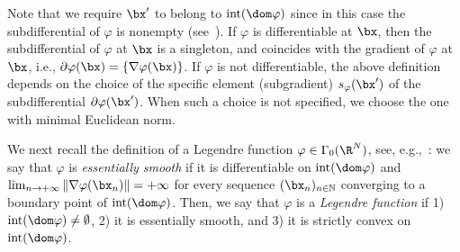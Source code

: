 \documentclass[11pt]{amsart}
\begin{document}
Note that we require  $\bx'$ to belong to $\mathrm{int}(\dom \varphi)$ since in this case the subdifferential  of $\varphi$ is nonempty (see~\cite[Theorem 9.23]{BCombettes}). If $\varphi$ is differentiable at $\bx$, then the subdifferential of $\varphi$ at $\bx$ is a singleton, and coincides with the gradient of $\varphi$ at $\bx$, i.e., $\partial \varphi(\bx)=\{\nabla \varphi(\bx)\}$. If $\varphi$ is not differentiable, the above definition depends on the choice of the specific element (subgradient) $s_\varphi(\bx')$ of the subdifferential $\partial \varphi(\bx')$. When such a choice is not specified, we choose the one with minimal Euclidean norm. 

We next recall the definition of a Legendre function $\varphi\in\Gamma_0(\R^N)$, see, e.g.,~\cite[Chapter 26]{Rock1970}: we say that $\varphi$ is \emph{essentially smooth} if it is differentiable on $\mathrm{int}(\dom \varphi)$ and $\lim_{n\to+\infty}\|\nabla \varphi(\bx_n)\|=+\infty$ for every sequence $(\bx_n)_{n\in\mathbb{N}}$ converging to a boundary point of $\mathrm{int}(\dom \varphi)$. Then, we say that $\varphi$ is a \emph{Legendre function} if 1) $\mathrm{int}(\dom \varphi)\neq\emptyset$, 2) it is essentially smooth, and 3) it is strictly convex on $\mathrm{int}(\dom \varphi)$.
\end{document}
